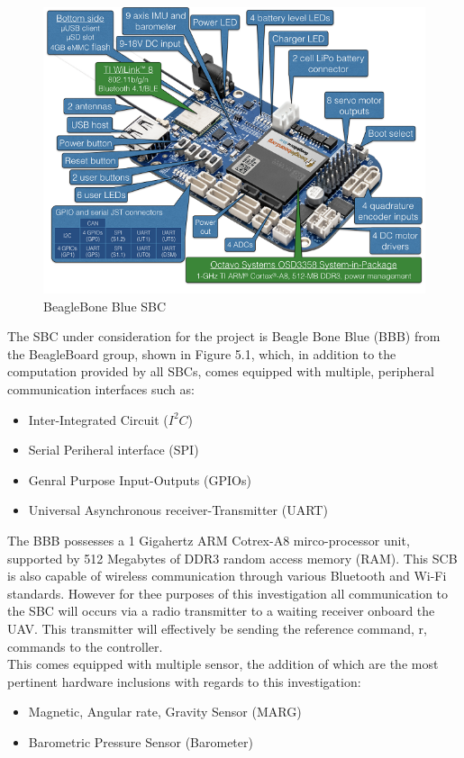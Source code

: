 \documentclass[12pt,a4paper,twoside]{report}
\begin{document}
			\begin{figure}[h!]
				\centering
				\includegraphics[width=1\linewidth]{beagle-bone-blue-annotated.png}
				\caption{BeagleBone Blue SBC}
				\label{fig:beaglebonebluesbc}
			\end{figure}
		
			The SBC under consideration for the project is Beagle Bone Blue (BBB) from the BeagleBoard group, shown in Figure 5.1, which, in addition to the computation provided by all SBCs, comes equipped with multiple, peripheral communication interfaces such as:
			\\
			\begin{itemize}
				\item
					Inter-Integrated Circuit ($I^{2}C$)
				\item
					Serial Periheral interface (SPI)
				\item
					 Genral Purpose Input-Outputs (GPIOs) 
				\item
					Universal Asynchronous receiver-Transmitter (UART) 
			\end{itemize}  
		
			The BBB possesses a 1 Gigahertz ARM Cotrex-A8 mirco-processor unit, supported by 512 Megabytes of DDR3 random access memory (RAM). This SCB is also capable of wireless communication through various Bluetooth and Wi-Fi standards. However for thee purposes of this investigation all communication to the SBC will occurs via a radio transmitter to a waiting receiver onboard the UAV. This transmitter will effectively be sending the reference command, r, commands to the controller. 
			\\
			This comes equipped with multiple sensor, the addition of which are the most pertinent hardware inclusions with regards to this investigation:
			\\
			\begin{itemize}
				\item
				Magnetic, Angular rate, Gravity Sensor (MARG)
				\item
				Barometric Pressure Sensor (Barometer)
			\end{itemize}  
			
\end{document}
